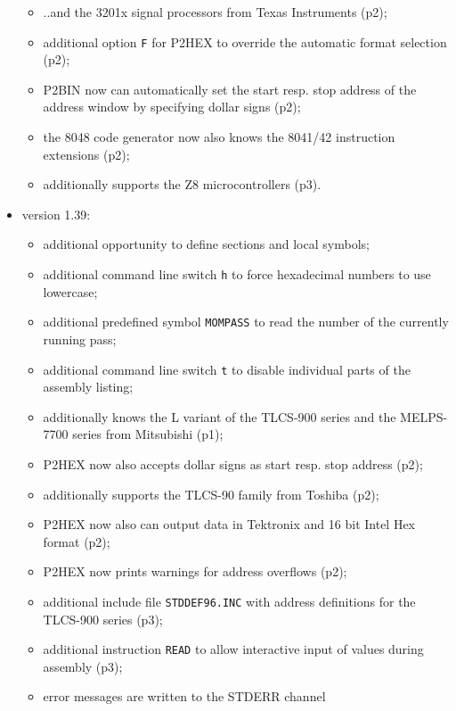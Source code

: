 \documentclass[12pt,twoside]{report}
\newcommand{\tty}[1]{{\tt #1}}
\begin{document}
\begin{itemize}
{\begin{itemize}
      \item{..and the 3201x signal processors from Texas
            Instruments (p2);}
      \item{additional option \tty{F} for P2HEX to override the
            automatic format selection (p2);}
      \item{P2BIN now can automatically set the start resp.
            stop address of the address window by specifying
            dollar signs (p2);}
      \item{the 8048 code generator now also knows the 8041/42
            instruction extensions (p2);}
      \item{additionally supports the Z8 microcontrollers (p3).}
      \end{itemize}}
\item{version 1.39:
      \begin{itemize}
      \item{additional opportunity to define sections and local
            symbols;}
      \item{additional command line switch \tty{h} to force hexadecimal
            numbers to use lowercase;}
      \item{additional predefined symbol \tty{MOMPASS} to read the
            number of the currently running pass;}
      \item{additional command line switch \tty{t} to disable
            individual parts of the assembly listing;}
      \item{additionally knows the L variant of the TLCS-900
            series and the MELPS-7700 series from Mitsubishi
            (p1);}
      \item{P2HEX now also accepts dollar signs as start resp.
            stop address (p2);}
      \item{additionally supports the TLCS-90 family from
            Toshiba (p2);}
      \item{P2HEX now also can output data in Tektronix and
            16 bit Intel Hex format (p2);}
      \item{P2HEX now prints warnings for address overflows
            (p2);}
      \item{additional include file \tty{STDDEF96.INC} with address
            definitions for the TLCS-900 series (p3);}
      \item{additional instruction \tty{READ} to allow interactive
            input of values during assembly (p3);}
      \item{error messages are written to the STDERR channel
}
\end{itemize}}
\end{itemize}
\end{document}
